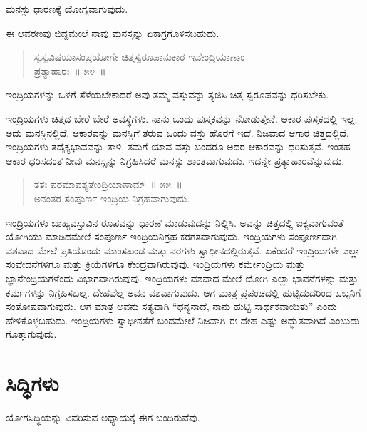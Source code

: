 ಮನಸ್ಸು ಧಾರಣಕ್ಕೆ ಯೋಗ್ಯವಾಗುವುದು. 

ಈ ಆವರಣವು ಬಿದ್ದಮೇಲೆ ನಾವು ಮನಸ್ಸನ್ನು ಏಕಾಗ್ರಗೊಳಿಸಬಹುದು. 

\vspace{-0.3cm}

\begin{verse}
ಸ್ವಸ್ವವಿಷಯಾಸಂಪ್ರಯೋಗೇ ಚಿತ್ತಸ್ವರೂಪಾನುಕಾರ ಇವೇಂದ್ರಿಯಾಣಾಂ\\ಪ್ರತ್ಯಾಹಾರಃ~॥ ೫೪~॥
\end{verse}

\vspace{-0.3cm}

ಇಂದ್ರಿಯಗಳನ್ನು ಒಳಗೆ ಸೆಳೆಯಬೇಕಾದರೆ ಅವು ತಮ್ಮ ವಸ್ತುವನ್ನು ತ್ಯಜಿಸಿ ಚಿತ್ತ ಸ್ವರೂಪವನ್ನು ಧರಿಸಬೇಕು. 

ಇಂದ್ರಿಯಗಳು ಚಿತ್ತದ ಬೇರೆ ಬೇರೆ ಅವಸ್ಥೆಗಳು. ನಾನು ಒಂದು ಪುಸ್ತಕವನ್ನು ನೋಡುತ್ತೇನೆ. ಆಕಾರ ಪುಸ್ತಕದಲ್ಲಿ ಇಲ್ಲ. ಅದು ಮನಸ್ಸಿನಲ್ಲಿದೆ. ಆಕಾರವನ್ನು ಮನಸ್ಸಿಗೆ ತರುವ ಒಂದು ವಸ್ತು ಹೊರಗೆ ಇದೆ. ನಿಜವಾದ ಆಗಾರ ಚಿತ್ತದಲ್ಲಿದೆ. ಇಂದ್ರಿಯಗಳು ತದೈಕ್ಯಭಾವವನ್ನು ತಾಳಿ, ತಮಗೆ ಯಾವ ವಸ್ತು ಬಂದರೂ ಅದರ ಆಕಾರವನ್ನು ಧರಿಸುತ್ತವೆ. ಇಂತಹ ಆಕಾರ ಧರಿಸದಂತೆ ನೀವು ಮನಸ್ಸನ್ನು ನಿಗ್ರಹಿಸಿದರೆ ಮನಸ್ಸು ಶಾಂತವಾಗುವುದು. ಇದನ್ನೇ ಪ್ರತ್ಯಾಹಾರವೆನ್ನುವುದು. 

\vspace{-0.3cm}

\begin{verse}
ತತಃ ಪರಮಾವಶ್ಯತೇಂದ್ರಿಯಾಣಾಮ್​~॥ ೫೫~॥\\ಅನಂತರ ಸಂಪೂರ್ಣ ಇಂದ್ರಿಯ ನಿಗ್ರಹವಾಗುವುದು. 
\end{verse}

\vspace{-0.3cm}

ಇಂದ್ರಿಯಗಳು ಬಾಹ್ಯವಸ್ತುವಿನ ರೂಪವನ್ನು ಧಾರಣೆ ಮಾಡುವುದನ್ನು ನಿಲ್ಲಿಸಿ. ಅವನ್ನು ಚಿತ್ತದಲ್ಲಿ ಐಕ್ಯವಾಗುವಂತೆ ಯೋಗಿಯು ಮಾಡಿದಮೇಲೆ ಸಂಪೂರ್ಣ ಇಂದ್ರಿಯನಿಗ್ರಹ ಕರಗತವಾಗುವುದು. ಇಂದ್ರಿಯಗಳು ಸಂಪೂರ್ಣವಾಗಿ ವಶವಾದ ಮೇಲೆ ಪ್ರತಿಯೊಂದು ಮಾಂಸಖಂಡ ಮತ್ತು ನರಗಳು ಸ್ವಾಧೀನದಲ್ಲಿರುತ್ತವೆ. ಏಕೆಂದರೆ ಇಂದ್ರಿಯಗಳೇ ಎಲ್ಲಾ ಸಂವೇದನೆಗಳಿಗೂ ಮತ್ತು ಕ್ರಿಯೆಗಳಿಗೂ ಕೇಂದ್ರವಾಗಿರುವುವು. ಇಂದ್ರಿಯಗಳು ಕರ್ಮೇಂದ್ರಿಯ ಮತ್ತು ಜ್ಞಾನೇಂದ್ರಿಯಗಳೆಂದು ವಿಭಾಗವಾಗಿರುವುವು. ಇಂದ್ರಿಯಗಳು ವಶವಾದ ಮೇಲೆ ಯೋಗಿ ಎಲ್ಲಾ ಭಾವನೆಗಳನ್ನು ಮತ್ತು ಕರ್ಮಗಳನ್ನು ನಿಗ್ರಹಿಸಬಲ್ಲ. ದೇಹವೆಲ್ಲ ಅವನ ವಶವಾಗುವುದು. ಆಗ ಮಾತ್ರ ಪ್ರಪಂಚದಲ್ಲಿ ಹುಟ್ಟಿದುದರಿಂದ ಒಬ್ಬನಿಗೆ ಸಂತೋಷವಾಗುವುದು. ಆಗ ಮಾತ್ರ ಅವನು ಸತ್ಯವಾಗಿ “ಧನ್ಯನಾದೆ, ನಾನು ಹುಟ್ಟಿ ಸಾರ್ಥಕವಾಯಿತು” ಎಂದು ಹೇಳಿಕೊಳ್ಳಬಹುದು. ಇಂದ್ರಿಯಗಳು ಸ್ವಾಧೀನತೆಗೆ ಬಂದಮೇಲೆ ನಿಜವಾಗಿ ಈ ದೇಹ ಎಷ್ಟು ಅದ್ಭುತವಾಗಿದೆ ಎಂಬುದು ಗೊತ್ತಾಗುವುದು.

\chapter{ಸಿದ್ಧಿಗಳು}

ಯೋಗಸಿದ್ಧಿಯನ್ನು ವಿವರಿಸುವ ಅಧ್ಯಾಯಕ್ಕೆ ಈಗ ಬಂದಿರುವೆವು. 

